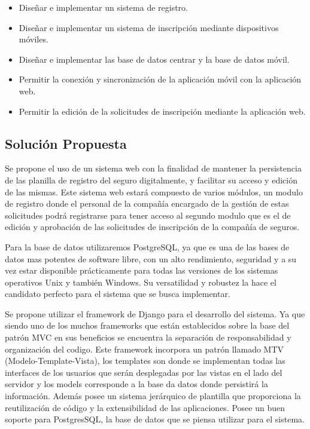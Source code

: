 \begin{itemize}

	\item Diseñar e implementar un sistema de registro.
	
	\item Diseñar e implementar un sistema de inscripción mediante dispositivos móviles.
	
	\item Diseñar e implementar las base de datos centrar y la base de datos móvil.
	
	\item Permitir la conexión y sincronización de la aplicación móvil con la aplicación web.
	
	\item Permitir la edición de la solicitudes de inscripción mediante la aplicación web.
	
	

\end{itemize}



\subsection{Solución Propuesta}
\setlength{\parskip}{5mm}
Se propone el uso de un sistema web con la finalidad de mantener la persistencia de las planilla de registro del seguro digitalmente, y facilitar su acceso y edición de las mismas. Este sistema web estará compuesto de varios módulos, un modulo de registro donde el personal de la compañía encargado de la gestión de estas solicitudes podrá registrarse para tener acceso al segundo modulo que es el de edición y aprobación de las solicitudes de inscripción de la compañía de seguros.



Para la base de datos utilizaremos PostgreSQL, ya que es una de las bases de datos mas potentes de software libre, con un alto rendimiento, seguridad y a su vez estar disponible prácticamente para todas las versiones de los sistemas operativos Unix y también Windows. Su versatilidad y robustez la hace el candidato perfecto para el sistema que se busca implementar.

Se propone utilizar el framework de Django para el desarrollo del sistema. Ya que siendo uno de los muchos frameworks que están establecidos sobre la base del patrón MVC en sus beneficios se encuentra la separación de responsabilidad y organización del codigo. Este framework incorpora un patrón llamado MTV (Modelo-Template-Vista), los templates son donde se implementan todas las interfaces de los usuarios que serán desplegadas por las vistas en el lado del servidor y los models corresponde a la base da datos donde persistirá la información. Además posee un sistema jerárquico de plantilla que proporciona la reutilización de código y la extensibilidad de las aplicaciones. Posee un buen soporte para PostgresSQL, la base de datos que se piensa utilizar para el sistema. 
\setlength{\parskip}{0mm}



